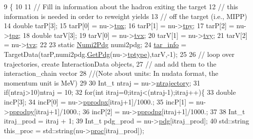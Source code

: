 \begin{DoxyCode}
9                                                                  \{
10     
11     \textcolor{comment}{// Fill in information about the hadron exiting the target}
12     \textcolor{comment}{// this information is needed in order to reweight yields}
13     \textcolor{comment}{// off the target (i.e., MIPP)}
14     \textcolor{keywordtype}{double} tarP[3];
15     tarP[0] = nu->\hyperlink{classnu__g4numi_a8693b10daf61759ad2decb2c3aac6a9e}{tpx};
16     tarP[1] = nu->\hyperlink{classnu__g4numi_a533f9a7e3002a702856c25dd1e5c7058}{tpy};
17     tarP[2] = nu->\hyperlink{classnu__g4numi_a63eb35fe1697f426543e34652202e30b}{tpz};
18     \textcolor{keywordtype}{double} tarV[3];
19     tarV[0] = nu->\hyperlink{classnu__g4numi_a8675345bdaaec6f0d4ff5f57571133a0}{tvx};
20     tarV[1] = nu->\hyperlink{classnu__g4numi_ac81b906ee11d4c5e74a1b80378cae373}{tvy};
21     tarV[2] = nu->\hyperlink{classnu__g4numi_adef9f7bf0e713b329e9af89ae32183ab}{tvz};
22     
23     \textcolor{keyword}{static} \hyperlink{class_numi2_pdg}{Numi2Pdg} numi2pdg;
24     \hyperlink{class_neutrino_flux_reweight_1_1_interaction_chain_data_a6df89bff97001a4988487fcfb9f4acea}{tar\_info} = TargetData(tarP,numi2pdg.\hyperlink{class_numi2_pdg_ac8d5438ffd52928a82738feed56e4f90}{GetPdg}(nu->\hyperlink{classnu__g4numi_a1047ac371479cee32c28f56adf885515}{tptype}),tarV,-1);
25     
26     \textcolor{comment}{// loop over trajectories, create InteractionData objects,}
27     \textcolor{comment}{// and add them to the interaction\_chain vector    }
28     \textcolor{comment}{//(Note about units: In nudata format, the momentum unit is MeV)}
29     
30     Int\_t ntraj = nu->\hyperlink{classnu__g4numi_abdbe76af4b20f3b5b5b2fb4b92156b42}{ntrajectory};
31     \textcolor{keywordflow}{if}(ntraj>10)ntraj = 10;
32     \textcolor{keywordflow}{for}(\textcolor{keywordtype}{int} itraj=0;itraj<(ntraj-1);itraj++)\{
33       \textcolor{keywordtype}{double} incP[3];
34       incP[0] = nu->\hyperlink{classnu__g4numi_a11ce125811f5f35337733e18f3753d31}{pprodpx}[itraj+1]/1000.;
35       incP[1] = nu->\hyperlink{classnu__g4numi_a7fa5412e9c5006b884f09226ae2c350a}{pprodpy}[itraj+1]/1000.;
36       incP[2] = nu->\hyperlink{classnu__g4numi_a0bd7772ccdfe00660ce45d94c107a240}{pprodpz}[itraj+1]/1000.;
37       
38       Int\_t itraj\_prod = itraj + 1;
39       Int\_t pdg\_prod   = nu->\hyperlink{classnu__g4numi_a4ed6688aee6debd26637a0401e5ef475}{pdg}[itraj\_prod];
40       std::string this\_proc = std::string(nu->\hyperlink{classnu__g4numi_a6583de2ce34a5d19409c09cc0b63692f}{proc}[itraj\_prod]);

\end{DoxyCode}
